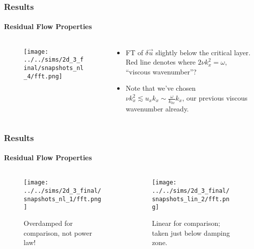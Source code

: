 \documentclass[dvipsnames]{beamer}
\begin{document}
\begin{frame}
    \frametitle{Results}
    \framesubtitle{Residual Flow Properties}

    \begin{columns}
        \begin{column}{0.5\textwidth}
            \begin{figure}[t]
                \centering
                \texttt{[image: ../../sims/2d\_3\_final/snapshots\_nl\_4/fft.png]}
            \end{figure}
        \end{column}
        \begin{column}{0.5\textwidth}
            \begin{itemize}
                \item FT of $\delta \vec{u}$ slightly below the critical layer.
                    Red line denotes where $2\nu k_x^2 = \omega$, ``viscous
                    wavenumber''?

                \item Note that we've chosen $\nu k_x^2 \lesssim u_xk_x \sim
                    \frac{\omega}{k_{0x}}k_x$, our previous viscous wavenumber
                    already.
            \end{itemize}
        \end{column}
    \end{columns}
\end{frame}

\begin{frame}
    \frametitle{Results}
    \framesubtitle{Residual Flow Properties}

    \begin{columns}
        \begin{column}{0.5\textwidth}
            \begin{figure}[t]
                \centering
                \texttt{[image: ../../sims/2d\_3\_final/snapshots\_nl\_1/fft.png]}
                \caption{Overdamped for comparison, not power law!}
            \end{figure}
        \end{column}
        \begin{column}{0.5\textwidth}
            \begin{figure}[t]
                \centering
                \texttt{[image: ../../sims/2d\_3\_final/snapshots\_lin\_2/fft.png]}
                \caption{Linear for comparison; taken just below damping zone.}
            \end{figure}
        \end{column}
    \end{columns}
\end{frame}
\end{document}
